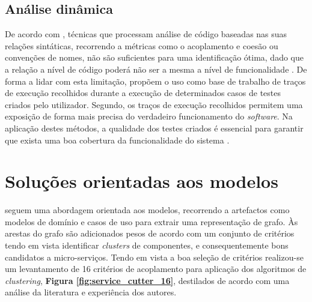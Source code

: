     
    
    


\subsection{Análise dinâmica}

    De acordo com \cite{is_cohesion_and_coupling_enough_candela16}, técnicas que processam análise de código baseadas nas suas relações sintáticas, recorrendo a métricas como o acoplamento e coesão ou convenções de nomes, não são suficientes para uma identificação ótima, dado que a relação a nível de código poderá não ser a mesma a nível de funcionalidade \citep{fome_jin_18}. De forma a lidar com esta limitação, \cite{fome_jin_18} propõem o uso como base de trabalho de traços de execução recolhidos durante a execução de determinados casos de testes criados pelo utilizador. Segundo, \cite{execution_traces_expose_behaviour_dit13} os traços de execução recolhidos permitem uma exposição de forma mais precisa do verdadeiro funcionamento do \textit{software}. 
    Na aplicação destes métodos, a qualidade dos testes criados é essencial para garantir que exista uma boa cobertura da funcionalidade do sistema \citep{fome_jin_18}.




\section{Soluções orientadas aos modelos}

   
   \cite{gysel16_service_cutter} seguem uma abordagem orientada aos modelos, recorrendo a artefactos como modelos de domínio e casos de uso para extrair uma representação de grafo. Às arestas do grafo são adicionados pesos de acordo com um conjunto de critérios tendo em vista identificar \textit{clusters} de componentes, e consequentemente bons candidatos a micro-serviços. Tendo em vista a boa seleção de critérios realizou-se um levantamento de 16 critérios de acoplamento para aplicação dos algoritmos de \textit{clustering}, \textbf{Figura \ref{fig:service_cutter_16}}, destilados de acordo com uma análise da literatura e experiência dos autores.
   
